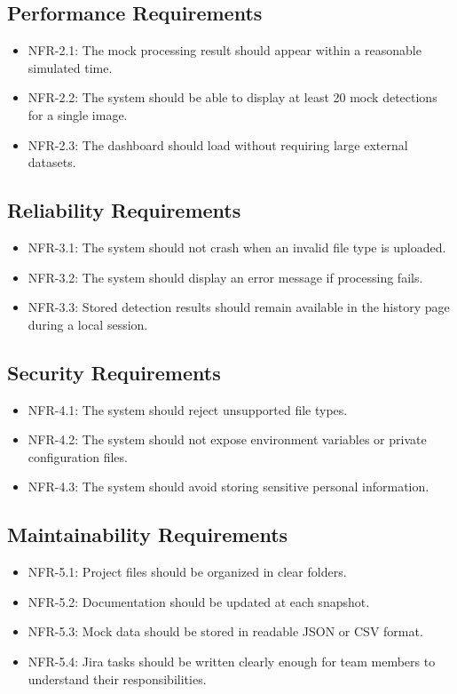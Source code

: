 \documentclass[12pt]{article}
\begin{document}
\subsection{Performance Requirements}

\begin{itemize}
    \item NFR-2.1: The mock processing result should appear within a reasonable simulated time.
    \item NFR-2.2: The system should be able to display at least 20 mock detections for a single image.
    \item NFR-2.3: The dashboard should load without requiring large external datasets.
\end{itemize}

\subsection{Reliability Requirements}

\begin{itemize}
    \item NFR-3.1: The system should not crash when an invalid file type is uploaded.
    \item NFR-3.2: The system should display an error message if processing fails.
    \item NFR-3.3: Stored detection results should remain available in the history page during a local session.
\end{itemize}

\subsection{Security Requirements}

\begin{itemize}
    \item NFR-4.1: The system should reject unsupported file types.
    \item NFR-4.2: The system should not expose environment variables or private configuration files.
    \item NFR-4.3: The system should avoid storing sensitive personal information.
\end{itemize}

\subsection{Maintainability Requirements}

\begin{itemize}
    \item NFR-5.1: Project files should be organized in clear folders.
    \item NFR-5.2: Documentation should be updated at each snapshot.
    \item NFR-5.3: Mock data should be stored in readable JSON or CSV format.
    \item NFR-5.4: Jira tasks should be written clearly enough for team members to understand their responsibilities.
\end{itemize}
\end{document}
